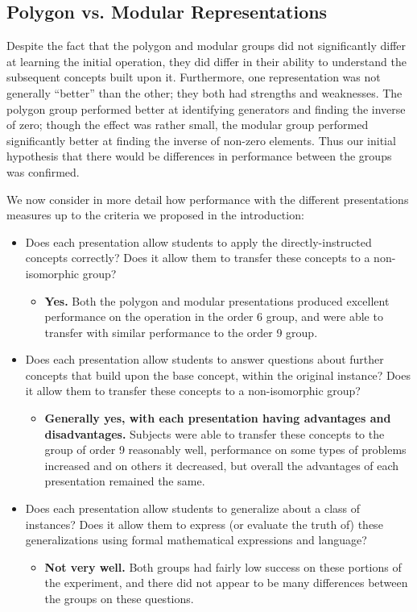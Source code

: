 \documentclass[man,10pt]{apa6}
\begin{document}
\subsection{Polygon vs. Modular Representations}
Despite the fact that the polygon and modular groups did not significantly differ at learning the initial operation, they did differ in their ability to understand the subsequent concepts built upon it. Furthermore, one representation was not generally ``better'' than the other; they both had strengths and weaknesses. The polygon group performed better at identifying generators and finding the inverse of zero; though the effect was rather small, the modular group performed significantly better at finding the inverse of non-zero elements. Thus our initial hypothesis that there would be differences in performance between the groups was confirmed. \par 
We now consider in more detail how performance with the different presentations measures up to the criteria we proposed in the introduction:
\begin{itemize}
\item Does each presentation allow students to apply the directly-instructed concepts correctly? Does it allow them to transfer these concepts to a non-isomorphic group?
\begin{itemize}
\item[] \textbf{Yes.} Both the polygon and modular presentations produced excellent performance on the operation in the order 6 group, and were able to transfer with similar performance to the order 9 group.
\end{itemize}
\item Does each presentation allow students to answer questions about further concepts that build upon the base concept, within the original instance? Does it allow them to transfer these concepts to a non-isomorphic group?
\begin{itemize}
\item[] \textbf{Generally yes, with each presentation having advantages and disadvantages.} Subjects were able to transfer these concepts to the group of order 9 reasonably well, performance on some types of problems increased and on others it decreased, but overall the advantages of each presentation remained the same. 
\end{itemize}
\item Does each presentation allow students to generalize about a class of instances? Does it allow them to express (or evaluate the truth of) these generalizations using formal mathematical expressions and language? 
\begin{itemize}
\item[] \textbf{Not very well.} Both groups had fairly low success on these portions of the experiment, and there did not appear to be many differences between the groups on these questions.
\end{itemize}
\end{itemize}
\end{document}
